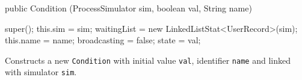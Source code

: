 \begin{code}

   public Condition (ProcessSimulator sim, boolean val, String name) \begin{hide} {
      super();
      this.sim = sim;
      waitingList = new LinkedListStat<UserRecord>(sim);
      this.name = name;
      broadcasting = false;
      state = val;
   }\end{hide}
\end{code}
 \begin{tabb}  Constructs a new \texttt{Condition} with initial value \texttt{val}, 
 identifier \texttt{name} and linked with simulator \texttt{sim}.
 \end{tabb}
\begin{htmlonly}
\end{htmlonly}


